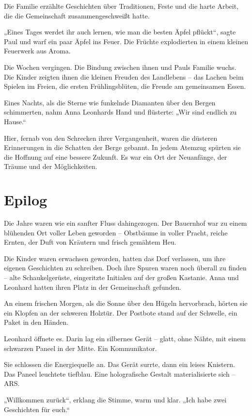 \documentclass[
]{article}
\begin{document}
Die Familie erzählte Geschichten über Traditionen, Feste und die harte Arbeit, die die Gemeinschaft zusammengeschweißt hatte.

„Eines Tages werdet ihr auch lernen, wie man die besten Äpfel pflückt``, sagte Paul und warf ein paar Äpfel ins Feuer. Die Früchte explodierten in einem kleinen Feuerwerk aus Aroma.

Die Wochen vergingen. Die Bindung zwischen ihnen und Pauls Familie wuchs. Die Kinder zeigten ihnen die kleinen Freuden des Landlebens -- das Lachen beim Spielen im Freien, die ersten Frühlingsblüten, die Freude am gemeinsamen Essen.

Eines Nachts, als die Sterne wie funkelnde Diamanten über den Bergen schimmerten, nahm Anna Leonhards Hand und flüsterte: „Wir sind endlich zu Hause.``

Hier, fernab von den Schrecken ihrer Vergangenheit, waren die düsteren Erinnerungen in die Schatten der Berge gebannt. In jedem Atemzug spürten sie die Hoffnung auf eine bessere Zukunft. Es war ein Ort der Neuanfänge, der Träume und der Möglichkeiten.

\section{Epilog}\label{epilog}

Die Jahre waren wie ein sanfter Fluss dahingezogen. Der Bauernhof war zu einem blühenden Ort voller Leben geworden -- Obstbäume in voller Pracht, reiche Ernten, der Duft von Kräutern und frisch gemähtem Heu.

Die Kinder waren erwachsen geworden, hatten das Dorf verlassen, um ihre eigenen Geschichten zu schreiben. Doch ihre Spuren waren noch überall zu finden -- alte Schaukelgerüste, eingeritzte Initialen auf der großen Kastanie. Anna und Leonhard hatten ihren Platz in der Gemeinschaft gefunden.

An einem frischen Morgen, als die Sonne über den Hügeln hervorbrach, hörten sie ein Klopfen an der schweren Holztür. Der Postbote stand auf der Schwelle, ein Paket in den Händen.

Leonhard öffnete es. Darin lag ein silbernes Gerät -- glatt, ohne Nähte, mit einem schwarzen Paneel in der Mitte. Ein Kommunikator.

Sie schlossen die Energiequelle an. Das Gerät surrte, dann ein leises Knistern. Das Paneel leuchtete tiefblau. Eine holografische Gestalt materialisierte sich -- ARS.

„Willkommen zurück``, erklang die Stimme, warm und klar. „Ich habe zwei Geschichten für euch.``
\end{document}
